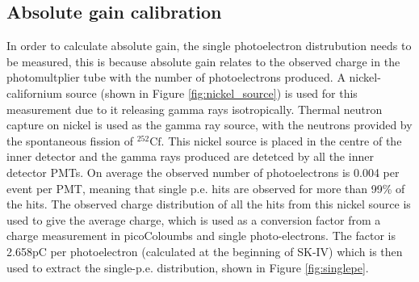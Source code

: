 \subsection{Absolute gain calibration}

In order to calculate absolute gain, the single photoelectron distrubution needs to be measured, this is because absolute gain relates to the observed charge in the photomultplier tube with the number of photoelectrons produced. A nickel-californium source (shown in Figure \ref{fig:nickel_source}) is used for this measurement due to it releasing gamma rays isotropically. Thermal neutron capture on nickel is used as the gamma ray source, with the neutrons provided by the spontaneous fission of ${ }^{252} \mathrm{Cf}$. This nickel source is placed in the centre of the inner detector and the gamma rays produced are detetced by all the inner detector PMTs. On average the observed number of photoelectrons is 0.004 per event per PMT, meaning that single p.e. hits are observed for more than 99\% of the hits. The observed charge distribution of all the hits from this nickel source is used to give the average charge, which is used as a conversion factor from a charge measurement in picoColoumbs and single photo-electrons. The factor is 2.658pC per photoelectron (calculated at the beginning of SK-IV) which is then used to extract the single-p.e. distribution, shown in Figure \ref{fig:singlepe}.


